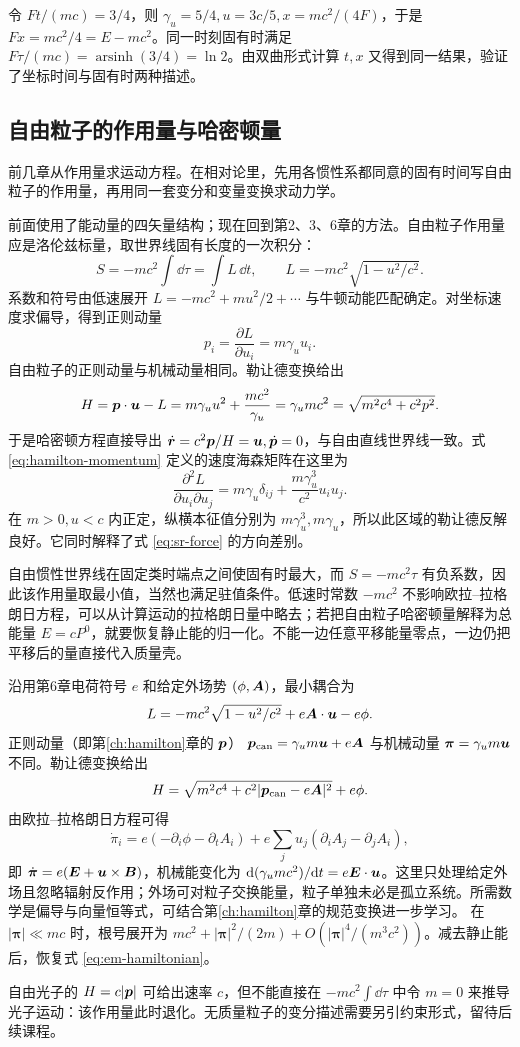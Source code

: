 \begin{example}[恒力做功的闭合核查]
令 $Ft/(mc)=3/4$，则 $\gamma_u=5/4,u=3c/5,x=mc^2/(4F)$，于是 $Fx=mc^2/4=E-mc^2$。同一时刻固有时满足 $F\tau/(mc)=\operatorname{arsinh}(3/4)=\ln2$。由双曲形式计算 $t,x$ 又得到同一结果，验证了坐标时间与固有时两种描述。
\end{example}

\subsection{自由粒子的作用量与哈密顿量}
前几章从作用量求运动方程。在相对论里，先用各惯性系都同意的固有时间写自由粒子的作用量，再用同一套变分和变量变换求动力学。

前面使用了能动量的四矢量结构；现在回到第2、3、6章的方法。自由粒子作用量应是洛伦兹标量，取世界线固有长度的一次积分：
\[
S=-mc^2\int\dd\tau=\int L\,\dd t,\qquad
L=-mc^2\sqrt{1-u^2/c^2}.
\]
系数和符号由低速展开 $L=-mc^2+mu^2/2+\cdots$ 与牛顿动能匹配确定。对坐标速度求偏导，得到正则动量
\[
p_i=\frac{\partial L}{\partial u_i}=m\gamma_uu_i.
\]
自由粒子的正则动量与机械动量相同。勒让德变换给出
\[
H=\boldsymbol{p}\cdot\boldsymbol{u}-L
=m\gamma_uu^2+\frac{mc^2}{\gamma_u}
=\gamma_umc^2=\sqrt{m^2c^4+c^2p^2}.
\]
于是哈密顿方程直接导出 $\dot{\boldsymbol{r}}=c^2\boldsymbol{p}/H=\boldsymbol{u},\dot{\boldsymbol{p}}=0$，与自由直线世界线一致。式 \eqref{eq:hamilton-momentum} 定义的速度海森矩阵在这里为
\[
\frac{\partial^2L}{\partial u_i\partial u_j}
=m\gamma_u\delta_{ij}+\frac{m\gamma_u^3}{c^2}u_iu_j.
\]
在 $m>0,u<c$ 内正定，纵横本征值分别为 $m\gamma_u^3,m\gamma_u$，所以此区域的勒让德反解良好。它同时解释了式 \eqref{eq:sr-force} 的方向差别。

\begin{physicsbox}[title={物理图像与理解：作用量驻值与最大固有时}]
自由惯性世界线在固定类时端点之间使固有时最大，而 $S=-mc^2\tau$ 有负系数，因此该作用量取最小值，当然也满足驻值条件。低速时常数 $-mc^2$ 不影响欧拉--拉格朗日方程，可以从计算运动的拉格朗日量中略去；若把自由粒子哈密顿量解释为总能量 $E=cP^0$，就要恢复静止能的归一化。不能一边任意平移能量零点，一边仍把平移后的量直接代入质量壳。
\end{physicsbox}

\begin{modernbox}[title={进一步探索：带电粒子的哈密顿量}]
沿用第6章电荷符号 $e$ 和给定外场势 $(\phi,\boldsymbol{A})$，最小耦合为
\[
L=-mc^2\sqrt{1-u^2/c^2}+e\boldsymbol{A}\cdot\boldsymbol{u}-e\phi.
\]
正则动量（即第\ref{ch:hamilton}章的 $\boldsymbol{p}$） $\boldsymbol{p}_{\rm can}=\gamma_um\boldsymbol{u}+e\boldsymbol{A}$ 与机械动量 $\boldsymbol{\pi}=\gamma_um\boldsymbol{u}$ 不同。勒让德变换给出
\[
H=\sqrt{m^2c^4+c^2|\boldsymbol{p}_{\rm can}-e\boldsymbol{A}|^2}+e\phi.
\]
由欧拉--拉格朗日方程可得
\[
\dot\pi_i=e(-\partial_i\phi-\partial_t A_i)
+e\sum_j u_j(\partial_i A_j-\partial_j A_i),
\]
即 $\dot{\boldsymbol{\pi}}=e(\boldsymbol{E}+\boldsymbol{u}\times\boldsymbol{B})$，机械能变化为 $\mathrm{d}(\gamma_umc^2)/\mathrm{d} t=e\boldsymbol{E}\cdot\boldsymbol{u}$。这里只处理给定外场且忽略辐射反作用；外场可对粒子交换能量，粒子单独未必是孤立系统。所需数学是偏导与向量恒等式，可结合第\ref{ch:hamilton}章的规范变换进一步学习。
在 $|\boldsymbol\pi|\ll mc$ 时，根号展开为 $mc^2+|\boldsymbol\pi|^2/(2m)+O(|\boldsymbol\pi|^4/(m^3c^2))$。减去静止能后，恢复式 \eqref{eq:em-hamiltonian}。
\end{modernbox}
自由光子的 $H=c|\boldsymbol{p}|$ 可给出速率 $c$，但不能直接在 $-mc^2\int\dd\tau$ 中令 $m=0$ 来推导光子运动：该作用量此时退化。无质量粒子的变分描述需要另引约束形式，留待后续课程。

